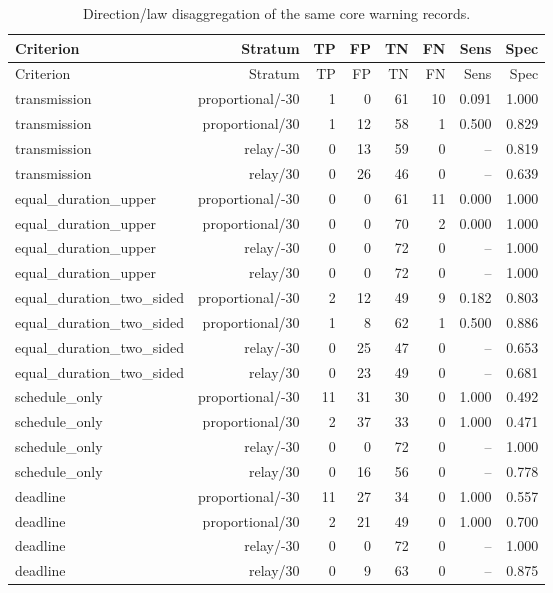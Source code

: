 \documentclass[10pt,letterpaper]{article}
\begin{document}
{\small
\begin{longtable}{lrrrrrrr}
\caption{Direction/law disaggregation of the same core warning records.}\\
\toprule
Criterion & Stratum & TP & FP & TN & FN & Sens & Spec\\
\midrule\endfirsthead
\toprule
Criterion & Stratum & TP & FP & TN & FN & Sens & Spec\\
\midrule\endhead
transmission & proportional/-30 & 1 & 0 & 61 & 10 & 0.091 & 1.000\\
transmission & proportional/30 & 1 & 12 & 58 & 1 & 0.500 & 0.829\\
transmission & relay/-30 & 0 & 13 & 59 & 0 & -- & 0.819\\
transmission & relay/30 & 0 & 26 & 46 & 0 & -- & 0.639\\
equal\_duration\_upper & proportional/-30 & 0 & 0 & 61 & 11 & 0.000 & 1.000\\
equal\_duration\_upper & proportional/30 & 0 & 0 & 70 & 2 & 0.000 & 1.000\\
equal\_duration\_upper & relay/-30 & 0 & 0 & 72 & 0 & -- & 1.000\\
equal\_duration\_upper & relay/30 & 0 & 0 & 72 & 0 & -- & 1.000\\
equal\_duration\_two\_sided & proportional/-30 & 2 & 12 & 49 & 9 & 0.182 & 0.803\\
equal\_duration\_two\_sided & proportional/30 & 1 & 8 & 62 & 1 & 0.500 & 0.886\\
equal\_duration\_two\_sided & relay/-30 & 0 & 25 & 47 & 0 & -- & 0.653\\
equal\_duration\_two\_sided & relay/30 & 0 & 23 & 49 & 0 & -- & 0.681\\
schedule\_only & proportional/-30 & 11 & 31 & 30 & 0 & 1.000 & 0.492\\
schedule\_only & proportional/30 & 2 & 37 & 33 & 0 & 1.000 & 0.471\\
schedule\_only & relay/-30 & 0 & 0 & 72 & 0 & -- & 1.000\\
schedule\_only & relay/30 & 0 & 16 & 56 & 0 & -- & 0.778\\
deadline & proportional/-30 & 11 & 27 & 34 & 0 & 1.000 & 0.557\\
deadline & proportional/30 & 2 & 21 & 49 & 0 & 1.000 & 0.700\\
deadline & relay/-30 & 0 & 0 & 72 & 0 & -- & 1.000\\
deadline & relay/30 & 0 & 9 & 63 & 0 & -- & 0.875\\
\bottomrule
\end{longtable}
}
\end{document}
